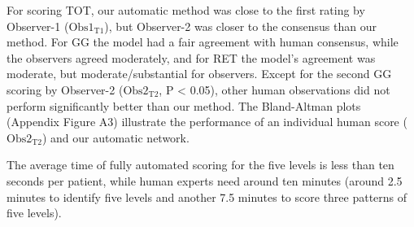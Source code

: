 For scoring TOT, our automatic method was close to the first rating by Observer-1 ($\text{Obs1}_{\text{T1}}$), but Observer-2 was closer to the consensus than our method. For GG the model had a fair agreement with human consensus, while the observers agreed moderately, and for RET the model’s agreement was moderate, but moderate/substantial for observers. Except for the second GG scoring by Observer-2 ($\text{Obs2}_{\text{T2}}$, P < 0.05), other human observations did not perform significantly better than our method. The Bland-Altman plots (Appendix Figure A3) illustrate the performance of an individual human score ($\text{Obs2}_{\text{T2}}$) and our automatic network.  

The average time of fully automated scoring for the five levels is less than ten seconds per patient, while human experts need around ten minutes (around 2.5 minutes to identify five levels and another 7.5 minutes to score three patterns of five levels).

